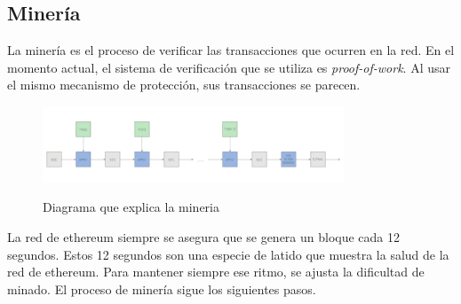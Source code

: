 \subsection{Minería}
La minería es el proceso de verificar las transacciones que ocurren en la red. En el momento actual, el sistema de verificación que se utiliza es \textit{proof-of-work}. Al usar el mismo mecanismo de protección, sus transacciones se parecen.
\begin{figure}[h!]
    \centering
    \includegraphics[width=0.8\textwidth]{Figures/Screenshot_20220507_131504.png}
    \caption{Diagrama que explica la mineria}
    \cite{web:block}
    \label{fg:block_diagram}
\end{figure}
La red de ethereum siempre se asegura que se genera un bloque cada 12 segundos.
Estos 12 segundos son una especie de latido que muestra la salud de la red de ethereum. Para mantener siempre ese ritmo, se ajusta la dificultad de minado. El proceso de minería sigue los siguientes pasos.
